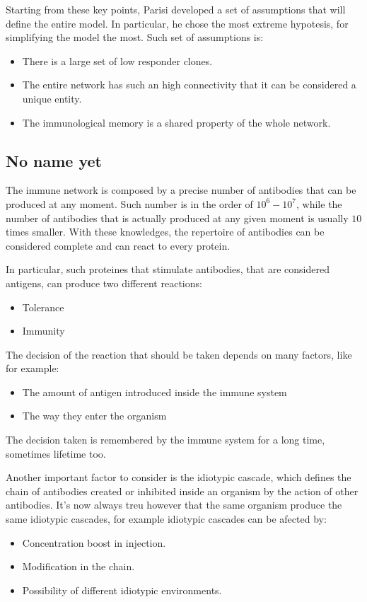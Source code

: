 Starting from these key points, Parisi developed a set of assumptions that will define the entire model. In particular, he chose the most extreme hypotesis, for simplifying the model the most. Such set of assumptions is:
\begin{itemize}
    \item There is a large set of low responder clones.
    \item The entire network has such an high connectivity that it can be considered a unique entity.
    \item The immunological memory is a shared property of the whole network.
\end{itemize}

\subsection{No name yet}

The immune network is composed by a precise number of antibodies that can be produced at any moment. Such number is in the order of $10^6 - 10^7$, while the number of antibodies that is actually produced at any given moment is usually $10$ times smaller. With these knowledges, the repertoire of antibodies can be considered complete and can react to every protein.

In particular, such proteines that stimulate antibodies, that are considered antigens, can produce two different reactions:
\begin{itemize}
    \item Tolerance
    \item Immunity
\end{itemize}
The decision of the reaction that should be taken depends on many factors, like for example:
\begin{itemize}
    \item The amount of antigen introduced inside the immune system
    \item The way they enter the organism
\end{itemize}
The decision taken is remembered by the immune system for a long time, sometimes lifetime too. 

Another important factor to consider is the idiotypic cascade, which defines the chain of antibodies created or inhibited inside an organism by the action of other antibodies. It's now always treu however that the same organism produce the same idiotypic cascades, for example idiotypic cascades can be afected by:
\begin{itemize}
    \item Concentration boost in injection.
    \item Modification in the chain.
    \item Possibility of different idiotypic environments.
\end{itemize}

